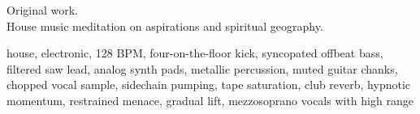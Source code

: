

\begin{notes}
Original work.\\
House music meditation on aspirations and spiritual geography.
\end{notes}

\begin{style}
house, electronic, 128 BPM, four-on-the-floor kick, syncopated offbeat bass, filtered saw lead, analog synth pads, metallic percussion, muted guitar chanks, chopped vocal sample, sidechain pumping, tape saturation, club reverb, hypnotic momentum, restrained menace, gradual lift, mezzosoprano vocals with high range
\end{style}

